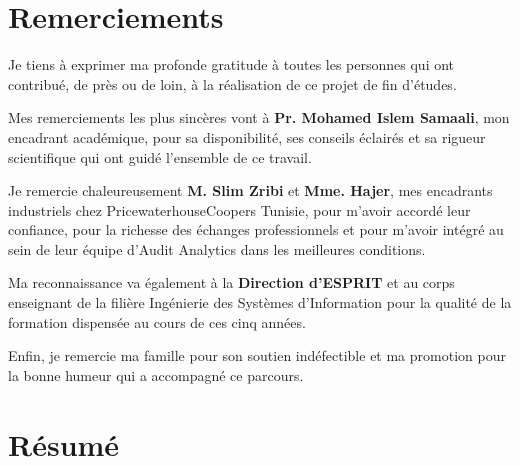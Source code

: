\documentclass[12pt,a4paper,twoside]{report}
\theoremstyle{definition}
\begin{document}
\chapter*{Remerciements}

Je tiens à exprimer ma profonde gratitude à toutes les personnes qui ont contribué,
de près ou de loin, à la réalisation de ce projet de fin d'études.

Mes remerciements les plus sincères vont à \textbf{Pr. Mohamed Islem Samaali},
mon encadrant académique, pour sa disponibilité, ses conseils éclairés et sa rigueur
scientifique qui ont guidé l'ensemble de ce travail.

Je remercie chaleureusement \textbf{M. Slim Zribi} et \textbf{Mme. Hajer}, mes encadrants
industriels chez PricewaterhouseCoopers Tunisie, pour m'avoir accordé leur confiance,
pour la richesse des échanges professionnels et pour m'avoir intégré au sein de leur
équipe d'Audit Analytics dans les meilleures conditions.

Ma reconnaissance va également à la \textbf{Direction d'ESPRIT} et au corps enseignant
de la filière Ingénierie des Systèmes d'Information pour la qualité de la formation
dispensée au cours de ces cinq années.

Enfin, je remercie ma famille pour son soutien indéfectible et ma promotion pour la
bonne humeur qui a accompagné ce parcours.

\chapter*{Résumé}
\end{document}
